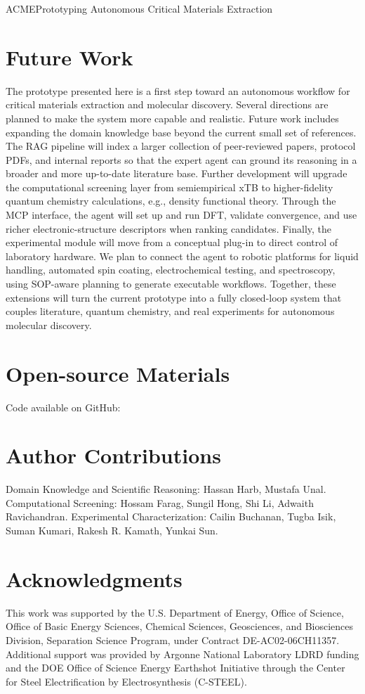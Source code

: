 \begin{teamsubmission}{ACME}{Prototyping Autonomous Critical Materials Extraction}
\section*{Future Work}

The prototype presented here is a first step toward an autonomous workflow for critical materials extraction and molecular discovery. Several directions are planned to make the system more capable and realistic. Future work includes expanding the domain knowledge base beyond the current small set of references. The RAG pipeline will index a larger collection of peer-reviewed papers, protocol PDFs, and internal reports so that the expert agent can ground its reasoning in a broader and more up-to-date literature base. Further development will upgrade the computational screening layer from semiempirical xTB to higher-fidelity quantum chemistry calculations, e.g., density functional theory. Through the MCP interface, the agent will set up and run DFT, validate convergence, and use richer electronic-structure descriptors when ranking candidates. Finally, the experimental module will move from a conceptual plug-in to direct control of laboratory hardware. We plan to connect the agent to robotic platforms for liquid handling, automated spin coating, electrochemical testing, and spectroscopy, using SOP-aware planning to generate executable workflows. Together, these extensions will turn the current prototype into a fully closed-loop system that couples literature, quantum chemistry, and real experiments for autonomous molecular discovery.

\section*{Open-source Materials}
Code available on GitHub: 

\section*{Author Contributions}
    Domain Knowledge and Scientific Reasoning: Hassan Harb, Mustafa Unal. Computational Screening: Hossam Farag,  Sungil Hong, Shi Li, Adwaith Ravichandran. Experimental Characterization: Cailin Buchanan, Tugba Isik, Suman Kumari, Rakesh R. Kamath, Yunkai Sun.
\section*{Acknowledgments}
This work was supported by the U.S. Department of Energy, Office of Science, Office of Basic Energy Sciences, Chemical Sciences, Geosciences, and Biosciences Division, Separation Science Program, under Contract DE-AC02-06CH11357.
Additional support was provided by Argonne National Laboratory LDRD funding and the DOE Office of Science Energy Earthshot Initiative through the Center for Steel Electrification by Electrosynthesis (C-STEEL).
\end{teamsubmission}



